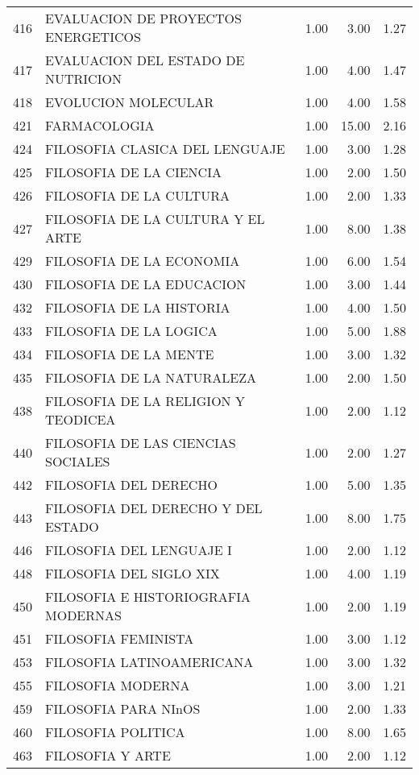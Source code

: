 \documentclass[12pt]{article}
\begin{document}
\begin{table}[ht]
\begin{tabular}{rlrrr}
  416 & EVALUACION DE PROYECTOS ENERGETICOS & 1.00 & 3.00 & 1.27 \\ 
  417 & EVALUACION DEL ESTADO DE NUTRICION & 1.00 & 4.00 & 1.47 \\ 
  418 & EVOLUCION MOLECULAR & 1.00 & 4.00 & 1.58 \\ 
  421 & FARMACOLOGIA & 1.00 & 15.00 & 2.16 \\ 
  424 & FILOSOFIA CLASICA DEL LENGUAJE & 1.00 & 3.00 & 1.28 \\ 
  425 & FILOSOFIA DE LA CIENCIA & 1.00 & 2.00 & 1.50 \\ 
  426 & FILOSOFIA DE LA CULTURA & 1.00 & 2.00 & 1.33 \\ 
  427 & FILOSOFIA DE LA CULTURA Y EL ARTE & 1.00 & 8.00 & 1.38 \\ 
  429 & FILOSOFIA DE LA ECONOMIA & 1.00 & 6.00 & 1.54 \\ 
  430 & FILOSOFIA DE LA EDUCACION & 1.00 & 3.00 & 1.44 \\ 
  432 & FILOSOFIA DE LA HISTORIA & 1.00 & 4.00 & 1.50 \\ 
  433 & FILOSOFIA DE LA LOGICA & 1.00 & 5.00 & 1.88 \\ 
  434 & FILOSOFIA DE LA MENTE & 1.00 & 3.00 & 1.32 \\ 
  435 & FILOSOFIA DE LA NATURALEZA & 1.00 & 2.00 & 1.50 \\ 
  438 & FILOSOFIA DE LA RELIGION Y TEODICEA & 1.00 & 2.00 & 1.12 \\ 
  440 & FILOSOFIA DE LAS CIENCIAS SOCIALES & 1.00 & 2.00 & 1.27 \\ 
  442 & FILOSOFIA DEL DERECHO & 1.00 & 5.00 & 1.35 \\ 
  443 & FILOSOFIA DEL DERECHO Y DEL ESTADO & 1.00 & 8.00 & 1.75 \\ 
  446 & FILOSOFIA DEL LENGUAJE I & 1.00 & 2.00 & 1.12 \\ 
  448 & FILOSOFIA DEL SIGLO XIX & 1.00 & 4.00 & 1.19 \\ 
  450 & FILOSOFIA E HISTORIOGRAFIA MODERNAS & 1.00 & 2.00 & 1.19 \\ 
  451 & FILOSOFIA FEMINISTA & 1.00 & 3.00 & 1.12 \\ 
  453 & FILOSOFIA LATINOAMERICANA & 1.00 & 3.00 & 1.32 \\ 
  455 & FILOSOFIA MODERNA & 1.00 & 3.00 & 1.21 \\ 
  459 & FILOSOFIA PARA NInOS & 1.00 & 2.00 & 1.33 \\ 
  460 & FILOSOFIA POLITICA & 1.00 & 8.00 & 1.65 \\ 
  463 & FILOSOFIA Y ARTE & 1.00 & 2.00 & 1.12 \\ 

\end{tabular}
\end{table}
\end{document}
